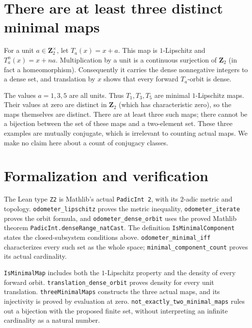 \documentclass[11pt]{article}
\begin{document}
\section{There are at least three distinct minimal maps}
For a unit $a\in\mathbf Z_2^\times$, let $T_a(x)=x+a$. This map is
$1$-Lipschitz and $T_a^n(x)=x+na$. Multiplication by a unit is a
continuous surjection of $\mathbf Z_2$ (in fact a homeomorphism).
Consequently it carries the dense nonnegative integers to a dense set,
and translation by $x$ shows that every forward $T_a$-orbit is dense.

The values $a=1,3,5$ are all units. Thus $T_1,T_3,T_5$ are minimal
$1$-Lipschitz maps. Their values at zero are distinct in $\mathbf Z_2$
(which has characteristic zero), so the maps themselves are distinct.
There are at least three such maps; there cannot be a bijection between
the set of these maps and a two-element set. These three examples are
mutually conjugate, which is irrelevant to counting actual maps. We make
no claim here about a count of conjugacy classes.

\section{Formalization and verification}
The Lean type \texttt{Z2} is Mathlib's actual \texttt{PadicInt 2}, with
its $2$-adic metric and topology. \texttt{odometer\_\allowbreak lipschitz} proves the
metric inequality, \texttt{odometer\_\allowbreak iterate} proves the orbit formula,
and \texttt{odometer\_\allowbreak dense\_\allowbreak orbit} uses the proved Mathlib theorem
\texttt{PadicInt.\allowbreak denseRange\_\allowbreak natCast}. The definition
\texttt{IsMinimal\allowbreak Component} states the closed-subsystem conditions above.
\texttt{odometer\_\allowbreak minimal\_\allowbreak iff} characterizes every such set as the whole
space; \texttt{minimal\_\allowbreak component\_\allowbreak count} proves its actual cardinality.

\texttt{IsMinimal\allowbreak Map} includes both the $1$-Lipschitz property and the
density of every forward orbit. \texttt{translation\_\allowbreak dense\_\allowbreak orbit}
proves density for every unit translation. \texttt{threeMinimal\allowbreak Maps}
constructs the three actual maps, and its injectivity is proved by
evaluation at zero. \texttt{not\_\allowbreak exactly\_\allowbreak two\_\allowbreak minimal\_\allowbreak maps} rules out
a bijection with the proposed finite set, without interpreting an
infinite cardinality as a natural number.
\end{document}
